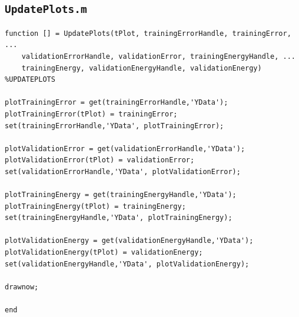 \documentclass[12pt,titlepage]{article}
\begin{document}
\subsection*{\texttt{UpdatePlots.m}}

\begin{lstlisting}
function [] = UpdatePlots(tPlot, trainingErrorHandle, trainingError, ...
    validationErrorHandle, validationError, trainingEnergyHandle, ...
    trainingEnergy, validationEnergyHandle, validationEnergy)
%UPDATEPLOTS

plotTrainingError = get(trainingErrorHandle,'YData');
plotTrainingError(tPlot) = trainingError;
set(trainingErrorHandle,'YData', plotTrainingError);

plotValidationError = get(validationErrorHandle,'YData');
plotValidationError(tPlot) = validationError;
set(validationErrorHandle,'YData', plotValidationError);

plotTrainingEnergy = get(trainingEnergyHandle,'YData');
plotTrainingEnergy(tPlot) = trainingEnergy;
set(trainingEnergyHandle,'YData', plotTrainingEnergy);

plotValidationEnergy = get(validationEnergyHandle,'YData');
plotValidationEnergy(tPlot) = validationEnergy;
set(validationEnergyHandle,'YData', plotValidationEnergy);

drawnow;

end
\end{lstlisting}
\end{document}
